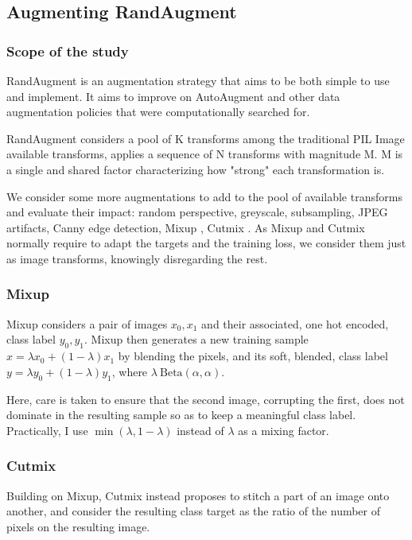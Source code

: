\subsection{Augmenting RandAugment}

\subsubsection{Scope of the study}

RandAugment is an augmentation strategy that aims to be both simple to use and implement. It aims to improve on AutoAugment and other data augmentation policies that were computationally searched for.

RandAugment considers a pool of K transforms among the traditional PIL Image available transforms, applies a sequence of N transforms with magnitude M. M is a single and shared factor characterizing how "strong" each transformation is.

We consider some more augmentations to add to the pool of available transforms and evaluate their impact: random perspective, greyscale, subsampling, JPEG artifacts, Canny edge detection, Mixup \citep{mixup}, Cutmix \citep{cutmix}. As Mixup and Cutmix normally require to adapt the targets and the training loss, we consider them just as image transforms, knowingly disregarding the rest.

\subsubsection{Mixup}

Mixup considers a pair of images $x_0, x_1$ and their associated, one hot encoded, class label $y_0, y_1$. Mixup then generates a new training sample $x= \lambda x_0 + (1-\lambda) x_1$ by blending the pixels, and its soft, blended, class label $y=\lambda y_0 + (1-\lambda) y_1$, where $\lambda~\text{Beta}(\alpha, \alpha)$.

Here, care is taken to ensure that the second image, corrupting the first, does not dominate in the resulting sample so as to keep a meaningful class label. Practically, I use $\min(\lambda, 1-\lambda)$ instead of $\lambda$ as a mixing factor.

\subsubsection{Cutmix}

Building on Mixup, Cutmix instead proposes to stitch a part of an image onto another, and consider the resulting class target as the ratio of the number of pixels on the resulting image.

